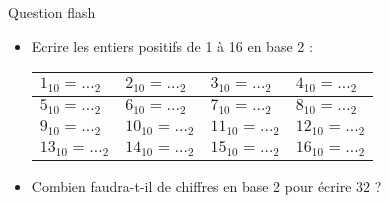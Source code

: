 \documentclass[10pt]{beamer}
\begin{document}
\begin{frame}
	\mframe{\Encodage}
	\begin{exampleblock}{\textcolor{yellow}{\flash} {Question flash}}
		\begin{itemize}
			\item<1-> Ecrire les entiers positifs de 1 à 16 en base 2 :
			      \renewcommand{\arraystretch}{1.5}
			      \begin{tabularx}{0.92\textwidth}{|X|X|X|X|}
				      \hline
				      $1_{10}= \dots_2$  & $2_{10}= \dots_2$  & $3_{10}= \dots_2$  & $4_{10}= \dots_2$  \\
				      \hline
				      $5_{10}= \dots_2$  & $6_{10}= \dots_2$  & $7_{10}= \dots_2$  & $8_{10}= \dots_2$  \\
				      \hline
				      $9_{10}= \dots_2$  & $10_{10}=\dots_2$  & $11_{10}=\dots_2$  & $12_{10}=\dots_2$  \\
				      \hline
				      $13_{10}= \dots_2$ & $14_{10}= \dots_2$ & $15_{10}= \dots_2$ & $16_{10}= \dots_2$ \\
				      \hline
			      \end{tabularx}
			\item<2->{Combien faudra-t-il de chiffres en base 2 pour écrire $32$ ? \\
			      \lpo[1]}

		\end{itemize}
	\end{exampleblock}
\end{frame}
\end{document}
